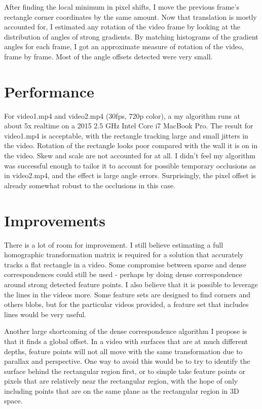 \documentclass{article}
\begin{document}
After finding the local minimum in pixel shifts, I move the previous frame's rectangle corner coordinates by the same amount. Now that translation is mostly accounted for, I estimated any rotation of the video frame by looking at the distribution of angles of strong gradients. By matching histograms of the gradient angles for each frame, I got an approximate measure of rotation of the video, frame by frame. Most of the angle offsets detected were very small.

\section{Performance}

For video1.mp4 and video2.mp4 (30fps, 720p color), a my algorithm runs at about 5x realtime on a 2015 2.5 GHz Intel Core i7 MacBook Pro. The result for video1.mp4 is acceptable, with the rectangle tracking large and small jitters in the video. Rotation of the rectangle looks poor compared with the wall it is on in the video. Skew and scale are not accounted for at all. I didn't feel my algorithm was successful enough to tailor it to account for possible temporary occlusions as in video2.mp4, and the effect is large angle errors. Surprisingly, the pixel offset is already somewhat robust to the occlusions in this case.

\section{Improvements}

There is a lot of room for improvement. I still believe estimating a full homographic transformation matrix is required for a solution that accurately tracks a flat rectangle in a video. Some compromise between sparse and dense correspondences could still be used - perhaps by doing dense correspondence around strong detected feature points. I also believe that it is possible to leverage the lines in the videos more. Some feature sets are designed to find corners and others blobs, but for the particular videos provided, a feature set that includes lines would be very useful.

Another large shortcoming of the dense correspondence algorithm I propose is that it finds a global offset. In a video with surfaces that are at much different depths, feature points will not all move with the same transformation due to parallax and perspective. One way to avoid this would be to try to identify the surface behind the rectangular region first, or to simple take feature points or pixels that are relatively near the rectangular region, with the hope of only including points that are on the same plane as the rectangular region in 3D space.
\end{document}
